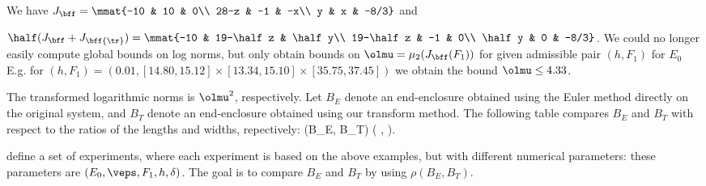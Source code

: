 {\begin{Example}
     We have
     {\scriptsize $J_\bff=\mmat{-10 & 10 & 0\\
                    28-z & -1 & -x\\
                    y  & x  & -8/3}
     $} and
     
    {\scriptsize $\half(J_\bff+J_\bff{\tr})=\mmat{-10 & 19-\half z & \half y\\
                    19-\half z & -1 & 0\\
                    \half y  & 0  & -8/3}
     $}.  
	 We could no longer easily compute global bounds on log norms,
	 but only obtain bounds on $\olmu =\mu_2(J_\bff(F_1))$ for given
     admissible pair $(h,F_1)$ for $E_0$
 	E.g. for {\small $(h,F_1)=(0.01, 
        [14.80, 15.12]\times [13.34, 15.10] \times [35.75, 37.45])$}
    we obtain the bound
    $\olmu\le 4.33$.
     \end{Example}

	
     
		The transformed logarithmic norms is $\olmu^2$, respectively. Let
		$B_E$ denote an end-enclosure obtained using the Euler method
		directly on the original system, and $B_T$ denote an end-enclosure
		obtained using our transform method.
        The following table compares $B_E$ and $B_T$
        with respect to the ratios of the lengths
        and widths, repectively:
            \rho(B_E, B_T) \as 
               \big( , 
                    \big).
        \eeql

       define 
     a set of experiments, where 
     each experiment is based on the above examples,
     but with different numerical parameters:
     these parameters are $(E_0, \veps, F_1, h, \delta)$.  The goal is to compare
     $B_E$ and $B_T$ by using $\rho(B_E, B_T)$.
	\begin{table*}[]
      \centering

	{\scriptsize
	}
\end{table*}}
